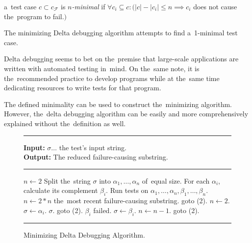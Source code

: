 \begin{defn}[$n$-minimality]\label{def02:4}
  a~test case $c \subset c_\mathcal{F}$ is \emph{$n$-minimal}
  if $\forall c_i \subseteq c:
  (|c| - |c_i| \leq n \implies c_i$ does not cause the~program to fail.$)$
\end{defn}

The minimizing Delta debugging algorithm attempts to find a~1-minimal test case.

Delta debugging seems to bet on the~premise that large-scale applications are written
with automated testing in~mind. On the~same note, it is the~recommended practice to
develop programs while at the~same time dedicating resources to write tests for that
program.

The defined minimality can be used to construct the~minimizing algorithm. 
However, the~delta debugging algorithm can be easily and more comprehensively explained 
without the~definition as well.


\begin{figure}[h]
	\hrule height.8pt depth0pt \kern2pt
	\textbf{Input:} $\sigma \ldots$ the test's input string. \\
	\textbf{Output:} The reduced failure-causing substring. 
	\hrule height.8pt depth0pt \kern2pt
	\begin{algorithmic}[1]
		\State $n \leftarrow 2$
		\State Split the~string $\sigma$ into $\alpha_1,\dots,\alpha_n$ of~equal size.
		\State For each $\alpha_i$, calculate its complement $\beta_i$.
		\State Run tests on $\alpha_1,\dots,\alpha_n,\beta_1,\dots,\beta_n$.
			\State $n \leftarrow 2*n$
				\Return the~most recent failure-causing substring.
			\Else
				\State goto (2).
			\EndIf
			\State $n \leftarrow 2$.
			\State $\sigma \leftarrow \alpha_i$.
				\Return $\sigma$.
			\Else
				\State goto (2).
			\EndIf
		\Else
			\Comment $\beta_i$ failed.
			\State $\sigma \leftarrow \beta_i$.
			\State $n \leftarrow n - 1$.
			\State goto (2).
		\EndIf
	\end{algorithmic} 
	\hrule height.8pt depth0pt \kern2pt
	\caption{Minimizing Delta Debugging Algorithm.} 
	\label{alg:dd}
\end{figure}

